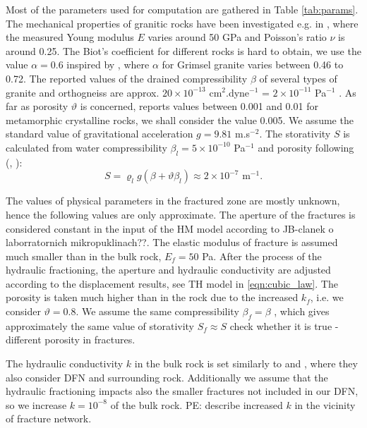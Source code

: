 \documentclass{article}
\newcommand{\todo}[1]{{\color{red}#1}}
\begin{document}
Most of the parameters used for computation are gathered in Table \ref{tab:params}.
The mechanical properties of granitic rocks have been investigated e.g. in \cite{Ljunggren1985}, where the measured Young modulus $E$ varies around 50 GPa and Poisson's ratio $\nu$ is around 0.25. The Biot's coefficient for different rocks is hard to obtain, we use the value $\alpha=0.6$ inspired by \cite{Selvadurai2019}, where $\alpha$ for Grimsel granite varies between 0.46 to 0.72.
The reported values of the drained compressibility $\beta$ of several types of granite and orthogneiss are approx. $20\times 10^{-13}$ cm${}^2$.dyne${}^{-1}$ = $2\times10^{-11}$ Pa${}^{-1}$ \cite{Zisman1933}.
As far as porosity $\vartheta$ is concerned, \cite{intera} reports values between 0.001 and 0.01 for metamorphic crystalline rocks, we shall consider the value 0.005.
We assume the standard value of gravitational acceleration $g=9.81$ m.s${}^{-2}$.
The storativity $S$ is calculated from water compressibility $\beta_l=5\times 10^{-10}$ Pa${}^{-1}$ and porosity following (\cite{Brace1968}, \cite{intera}):
\[ S = \varrho_l g(\beta + \vartheta\beta_l) \approx 2\times 10^{-7} \mbox{ m}^{-1}. \]


The values of physical parameters in the fractured zone are mostly unknown, hence the following values are only approximate.
The aperture of the fractures is considered constant in the input of the HM model according to \todo{JB-clanek o laborratornich mikropuklinach??}. %
The elastic modulus of fracture is assumed much smaller than in the bulk rock, $E_f=50$ Pa. After the process of the hydraulic fractioning, the aperture and hydraulic conductivity are adjusted according to the displacement results, see TH model in \eqref{eqn:cubic_law}. The porosity is taken much higher than in the rock due to the increased $k_f$, i.e. we consider $\vartheta=0.8$. We assume the same compressibility $\beta_f=\beta$ , which gives approximately the same value of storativity $S_f\approx S$ \todo{check whether it is true - different porosity in fractures}.

The hydraulic conductivity $k$ in the bulk rock is set similarly to \cite{Sperl2008} and \cite{Doonechaly2016}, where they also consider DFN and surrounding rock.
Additionally we assume that the hydraulic fractioning impacts also the smaller fractures not included in our DFN, so we increase $k=10^{-8}$ of the bulk rock.
\todo{PE: describe increased $k$ in the vicinity of fracture network.}
\end{document}
